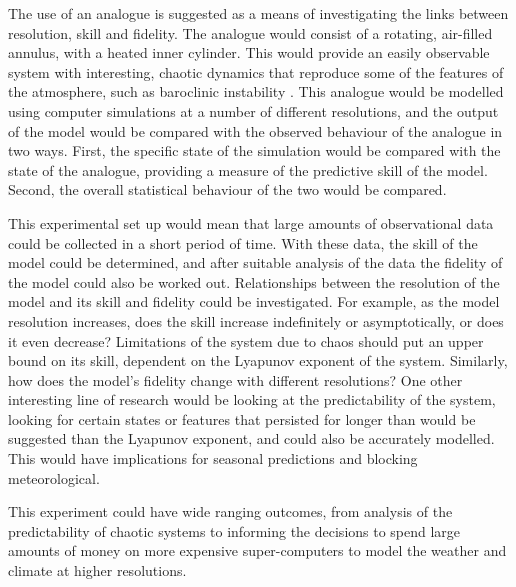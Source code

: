 \documentclass[12pt,a4paper]{article}
\begin{document}
The use of an analogue is suggested as a means of investigating the links between resolution, skill
and fidelity. The analogue would consist of a rotating, air-filled annulus, with a heated inner
cylinder. This would provide an easily observable system with interesting, chaotic dynamics that
reproduce some of the features of the atmosphere, such as baroclinic instability
\cite{castrejon2007baroclinic}. This analogue would be modelled using computer simulations at a
number of different resolutions, and the output of the model would be compared with the observed
behaviour of the analogue in two ways. First, the specific state of the simulation would be compared
with the state of the analogue, providing a measure of the predictive skill of the model. Second,
the overall statistical behaviour of the two would be compared.

This experimental set up would mean that large amounts of observational data could be collected in a
short period of time. With these data, the skill of the model could be determined, and after
suitable analysis of the data the fidelity of the model could also be worked out. Relationships
between the resolution of the model and its skill and fidelity could be investigated. For example,
as the model resolution increases, does the skill increase indefinitely or asymptotically, or does
it even decrease? Limitations of the system due to chaos should put an upper bound on its skill,
dependent on the Lyapunov exponent of the system. Similarly, how does the model's fidelity change
with different resolutions? One other interesting line of research would be looking at the
predictability of the system, looking for certain states or features that persisted for longer than
would be suggested than the Lyapunov exponent, and could also be accurately modelled. This would
have implications for seasonal predictions and blocking meteorological.

This experiment could have wide ranging outcomes, from analysis of the predictability of chaotic
systems to informing the decisions to spend large amounts of money on more expensive super-computers
to model the weather and climate at higher resolutions. 

\printbibliography[title={References}]
\end{document}
